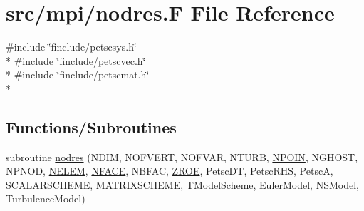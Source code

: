 \hypertarget{mpi_2nodres_8_f}{\section{src/mpi/nodres.F File Reference}
\label{mpi_2nodres_8_f}
}
{\ttfamily \#include \char`\"{}finclude/petscsys.\-h\char`\"{}}\\*
{\ttfamily \#include \char`\"{}finclude/petscvec.\-h\char`\"{}}\\*
{\ttfamily \#include \char`\"{}finclude/petscmat.\-h\char`\"{}}\\*
\subsection*{Functions/\-Subroutines}
\begin{DoxyCompactItemize}
\item 
subroutine \hyperlink{mpi_2nodres_8_f_afe82d6b12790dae1c4e9686db54b5f82}{nodres} (N\-D\-I\-M, N\-O\-F\-V\-E\-R\-T, N\-O\-F\-V\-A\-R, N\-T\-U\-R\-B, \hyperlink{mesh_8com_ae28c1572321efcd8715b974d87d20c58}{N\-P\-O\-I\-N}, N\-G\-H\-O\-S\-T, N\-P\-N\-O\-D, \hyperlink{mesh_8com_aee5e75b79d0e815c0603cfbccc618957}{N\-E\-L\-E\-M}, \hyperlink{mesh_8com_a78142d59d4cbb9fedbede16187658dd3}{N\-F\-A\-C\-E}, N\-B\-F\-A\-C, \hyperlink{myts_8com_a0c4fbcdb78e6b50c8919d714e4b5a694}{Z\-R\-O\-E}, Petsc\-D\-T, Petsc\-R\-H\-S, Petsc\-A, S\-C\-A\-L\-A\-R\-S\-C\-H\-E\-M\-E, M\-A\-T\-R\-I\-X\-S\-C\-H\-E\-M\-E, T\-Model\-Scheme, Euler\-Model, N\-S\-Model, Turbulence\-Model)
\end{DoxyCompactItemize}


